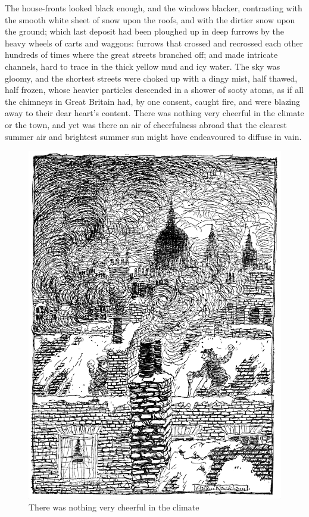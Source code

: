 \documentclass[paper=5.5in:8.5in,BCOR=5mm,twoside,DIV=calc,12pt,usegeometry]{scrbook} %
\begin{document}
The house-fronts looked black enough, and the windows blacker, contrasting with the smooth white sheet of snow upon the roofs, and with the dirtier snow upon the ground; which last deposit had been ploughed up in deep furrows by the heavy wheels of carts and waggons: furrows that crossed and recrossed each other hundreds of times where the great streets branched off; and made intricate channels, hard to trace in the thick yellow mud and icy water. The sky was gloomy, and the shortest streets were choked up with a dingy mist, half thawed, half frozen, whose heavier particles descended in a shower of sooty atoms, as if all the chimneys in Great Britain had, by one consent, caught fire, and were blazing away to their dear heart's content. There was nothing very cheerful in the climate or the town, and yet was there an air of cheerfulness abroad that the clearest summer air and brightest summer sun might have endeavoured to diffuse in vain.

\begin{figure}
\begin{minipage}[c]{\linewidth}
\includegraphics[width=\linewidth]{climate}
\caption*{There was nothing very cheerful in the climate}
\end{minipage}
\end{figure}
\end{document}
